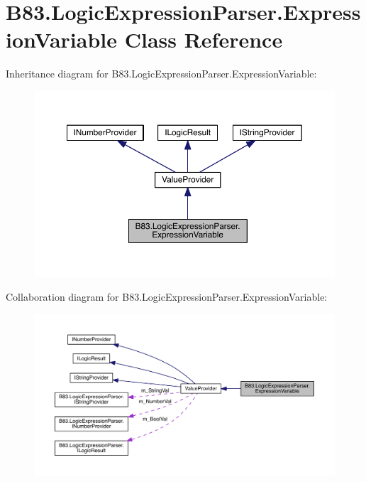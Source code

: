 \hypertarget{class_b83_1_1_logic_expression_parser_1_1_expression_variable}{}\section{B83.\+Logic\+Expression\+Parser.\+Expression\+Variable Class Reference}
\label{class_b83_1_1_logic_expression_parser_1_1_expression_variable}


Inheritance diagram for B83.\+Logic\+Expression\+Parser.\+Expression\+Variable\+:\nopagebreak
\begin{figure}[H]
\begin{center}
\leavevmode
\includegraphics[width=350pt]{class_b83_1_1_logic_expression_parser_1_1_expression_variable__inherit__graph}
\end{center}
\end{figure}


Collaboration diagram for B83.\+Logic\+Expression\+Parser.\+Expression\+Variable\+:\nopagebreak
\begin{figure}[H]
\begin{center}
\leavevmode
\includegraphics[width=350pt]{class_b83_1_1_logic_expression_parser_1_1_expression_variable__coll__graph}
\end{center}
\end{figure}
